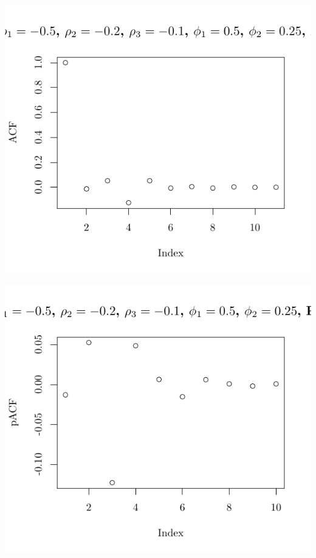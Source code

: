 \documentclass[10pt]{paper}\usepackage[]{graphicx}\usepackage[]{color}
\makeatletter
\def\maxwidth{ %
  \ifdim\Gin@nat@width>\linewidth
    \linewidth
  \else
    \Gin@nat@width
  \fi
}
\newenvironment{knitrout}{}{} %
\makeatother
\begin{document}
\begin{knitrout}
{\centering \includegraphics[width=\maxwidth]{figure/graphics-plotter-151} 

}




{\centering \includegraphics[width=\maxwidth]{figure/graphics-plotter-152} 

}





\end{knitrout}
\end{document}

